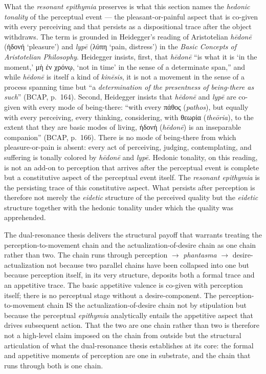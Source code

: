 \documentclass{article}
\newcommand{\gk}[1]{{\greekfont #1}}
\begin{document}
What the \textit{resonant epithymia} preserves is what this section names the \textit{hedonic tonality} of the perceptual event --- the pleasant-or-painful aspect that is co-given with every perceiving and that persists as a dispositional trace after the object withdraws. The term is grounded in Heidegger's reading of Aristotelian \textit{hēdonē} (\gk{ἡδονή} `pleasure') and \textit{lypē} (\gk{λύπη} `pain, distress') in the \textit{Basic Concepts of Aristotelian Philosophy}. Heidegger insists, first, that \textit{hēdonē} ``is what it is `in the moment,' \gk{μὴ ἐν χρόνῳ}, `not in time' in the sense of a determinate span,'' and while \textit{hēdonē} is itself a kind of \textit{kinēsis}, it is not a movement in the sense of a process spanning time but ``a \textit{determination of the presentness of being-there as such}'' (BCAP, p.~164). Second, Heidegger insists that \textit{hēdonē} and \textit{lypē} are co-given with every mode of being-there: ``with every \gk{πάθος} (\textit{pathos}), but equally with every perceiving, every thinking, considering, with \gk{θεωρία} (\textit{theōria}), to the extent that they are basic modes of living, \gk{ἡδονή} (\textit{hēdonē}) is an inseparable companion'' (BCAP, p.~166). There is no mode of being-there from which pleasure-or-pain is absent: every act of perceiving, judging, contemplating, and suffering is tonally colored by \textit{hēdonē} and \textit{lypē}. Hedonic tonality, on this reading, is not an add-on to perception that arrives after the perceptual event is complete but a constitutive aspect of the perceptual event itself. The \textit{resonant epithymia} is the persisting trace of this constitutive aspect. What persists after perception is therefore not merely the \textit{eidetic} structure of the perceived quality but the \textit{eidetic} structure together with the hedonic tonality under which the quality was apprehended.

The dual-resonance thesis delivers the structural payoff that warrants treating the perception-to-movement chain and the actualization-of-desire chain as one chain rather than two. The chain runs through perception $\rightarrow$ \textit{phantasma} $\rightarrow$ desire-actualization not because two parallel chains have been collapsed into one but because perception itself, in its very structure, deposits both a formal trace and an appetitive trace. The basic appetitive valence is co-given with perception itself; there is no perceptual stage without a desire-component. The perception-to-movement chain IS the actualization-of-desire chain not by stipulation but because the perceptual \textit{epithymia} analytically entails the appetitive aspect that drives subsequent action. That the two are one chain rather than two is therefore not a high-level claim imposed on the chain from outside but the structural articulation of what the dual-resonance thesis establishes at its core: the formal and appetitive moments of perception are one in substrate, and the chain that runs through both is one chain.
\end{document}
